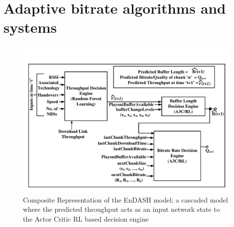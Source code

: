 \section{Adaptive bitrate algorithms and systems}

\begin{figure}[h!]
	\begin{center}
		\includegraphics[width=0.9\linewidth]{img/EnDASH_system}
	\end{center}
	\caption{\label{fig:EnDASH_system} Composite Representation of the EnDASH model; a cascaded model where the predicted throughput acts as an input network state to the Actor Critic RL based decision engine}
\end{figure}